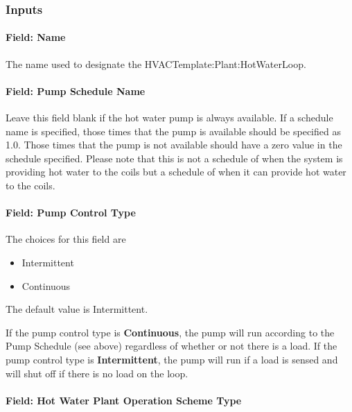 \subsubsection{Inputs}\label{inputs-28-000}

\paragraph{Field: Name}\label{field-name-15-003}

The name used to designate the HVACTemplate:Plant:HotWaterLoop.

\paragraph{Field: Pump Schedule Name}\label{field-pump-schedule-name-1}

Leave this field blank if the hot water pump is always available. If a schedule name is specified, those times that the pump is available should be specified as 1.0. Those times that the pump is not available should have a zero value in the schedule specified. Please note that this is not a schedule of when the system is providing hot water to the coils but a schedule of when it can provide hot water to the coils.

\paragraph{Field: Pump Control Type}\label{field-pump-control-type-1}

The choices for this field are

\begin{itemize}
\item
  Intermittent
\item
  Continuous
\end{itemize}

The default value is Intermittent.

If the pump control type is \textbf{Continuous}, the pump will run according to the Pump Schedule (see above) regardless of whether or not there is a load. If the pump control type is \textbf{Intermittent}, the pump will run if a load is sensed and will shut off if there is no load on the loop.

\paragraph{Field: Hot Water Plant Operation Scheme Type}\label{field-hot-water-plant-operation-scheme-type}

